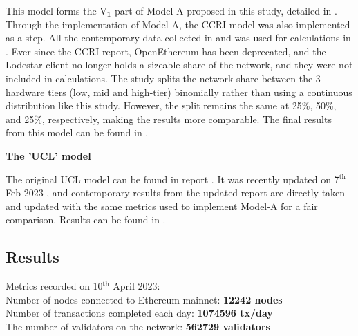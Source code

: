 This model \cite{CryptoCarbonRatingsInstitute2022TheNetwork} forms the $ \boldsymbol{\overline{\mathrm{V}}_{1}}$ part of Model-A proposed in this study, detailed in . Through the implementation of Model-A, the CCRI model was also implemented as a step. All the contemporary data collected in  and  was used for calculations in . Ever since the CCRI report, OpenEthereum has been deprecated, and the Lodestar client no longer holds a sizeable share of the network, and they were not included in calculations. The study splits the network share between the 3 hardware tiers (low, mid and high-tier) binomially rather than using a continuous distribution like this study. However, the split remains the same at 25\%, 50\%, and 25\%, respectively, making the results more comparable. The final results from this model can be found in .

\textbf{The 'UCL' model} 

The original UCL model can be found in report \cite{Platt2022TheProof-of-Work}. It was recently updated on 7$\mathrm{^{th}}$ Feb 2023 \cite{IbanezTheExpansion}, and contemporary results from the updated report are directly taken and updated with the same metrics used to implement Model-A for a fair comparison. Results can be found in . 


\subsection{Results}
\label{ResultsSection}
Metrics recorded on 10$\mathrm{^{th}}$ April 2023: \\
Number of nodes connected to Ethereum mainnet: \textbf{12242 nodes} \cite{NodewatchAnalytics} \\
Number of transactions completed each day: \textbf{1074596 tx/day}  \cite{EthereumBlockchair} \\
The number of validators on the network: \textbf{562729 validators} 
\cite{EthereumEthereum.orgc}

